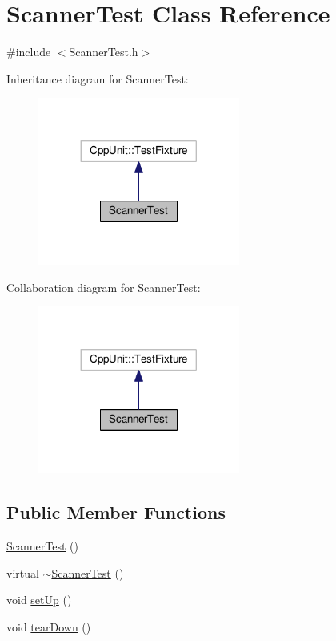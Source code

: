 \hypertarget{class_scanner_test}{}\section{Scanner\+Test Class Reference}
\label{class_scanner_test}


{\ttfamily \#include $<$Scanner\+Test.\+h$>$}



Inheritance diagram for Scanner\+Test\+:\nopagebreak
\begin{figure}[H]
\begin{center}
\leavevmode
\includegraphics[width=188pt]{class_scanner_test__inherit__graph}
\end{center}
\end{figure}


Collaboration diagram for Scanner\+Test\+:\nopagebreak
\begin{figure}[H]
\begin{center}
\leavevmode
\includegraphics[width=188pt]{class_scanner_test__coll__graph}
\end{center}
\end{figure}
\subsection*{Public Member Functions}
\begin{DoxyCompactItemize}
\item 
\hyperlink{class_scanner_test_afc2605e8ad9a35e149bc51a13cba3295}{Scanner\+Test} ()
\item 
virtual \hyperlink{class_scanner_test_a3082717ef197a913610879ef283dc6d4}{$\sim$\+Scanner\+Test} ()
\item 
void \hyperlink{class_scanner_test_af1f15a7f621e57f485d905c912ff4669}{set\+Up} ()
\item 
void \hyperlink{class_scanner_test_a72e53c25dffb1a798a76c3076c1126de}{tear\+Down} ()
\end{DoxyCompactItemize}
